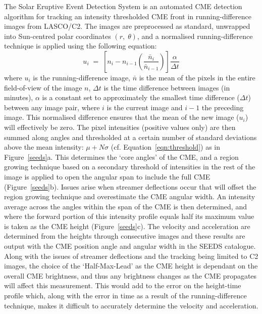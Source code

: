 \documentclass[namedreferences]{SolarPhysics}
\begin{document}
\begin{article}
The Solar Eruptive Event Detection System \citep[SEEDS\footnote{http://spaceweather.gmu.edu/seeds/};][]{2008SoPh..248..485O} is an automated CME detection algorithm for tracking an intensity thresholded CME front in running-difference images from LASCO/C2. The images are preprocessed as standard, unwrapped into Sun-centred polar coordinates $(r,\; \theta)$, and a normalised running-difference technique is applied using the following equation:
\begin{equation}
u_i \; = \; \left[ n_i - n_{i-1} \left( \frac{\bar{n}_i}{\bar{n}_{i-1}} \right) \right] \frac{\alpha}{\Delta t}
\end{equation}
where $u_i$ is the running-difference image, $\bar{n}$ is the mean of the pixels in the entire field-of-view of the image $n$, $\Delta t$ is the time difference between images (in minutes), $\alpha$ is a constant set to approximately the smallest time difference ($\Delta t$) between any image pair, where $i$ is the current image and $i-1$ the preceding image. This normalised difference ensures that the mean of the new image ($u_i$) will effectively be zero.
\newline
\indent The pixel intensities (positive values only) are then summed along angles and thresholded at a certain number of standard deviations above the mean intensity: $\mu+N\sigma$ (cf. Equation~\ref{eqn:threshold}) as in Figure~\ref{seeds}a. This determines the `core angles' of the CME, and a region growing technique based on a secondary threshold of intensities in the rest of the image is applied to open the angular span to include the full CME (Figure~\ref{seeds}b). Issues arise when streamer deflections occur that will offset the region growing technique and overestimate the CME angular width. An intensity average across the angles within the span of the CME is then determined, and where the forward portion of this intensity profile equals half its maximum value is taken as the CME height (Figure~\ref{seeds}c). The velocity and acceleration are determined from the heights through consecutive images and these results are output with the CME position angle and angular width in the SEEDS catalogue.
\newline
\indent Along with the issues of streamer deflections and the tracking being limited to C2 images, the choice of the `Half-Max-Lead' as the CME height is dependant on the overall CME brightness, and thus any brightness changes as the CME propagates will affect this measurement. This would add to the error on the height-time profile which, along with the error in time as a result of the running-difference technique, makes it difficult to accurately determine the velocity and acceleration.


\end{article}
\end{document}
